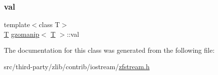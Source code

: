 \subsubsection{\texorpdfstring{val}{val}}
{\footnotesize\ttfamily template$<$class T$>$ \\
\mbox{\hyperlink{_aes_8c_af6f2f773ebe19973d2b24c1b959affe6}{T}} \mbox{\hyperlink{classgzomanip}{gzomanip}}$<$ \mbox{\hyperlink{_aes_8c_af6f2f773ebe19973d2b24c1b959affe6}{T}} $>$\+::val\hspace{0.3cm}{\ttfamily [private]}}



The documentation for this class was generated from the following file\+:\begin{DoxyCompactItemize}
\item 
src/third-\/party/zlib/contrib/iostream/\mbox{\hyperlink{zfstream_8h}{zfstream.\+h}}\end{DoxyCompactItemize}
